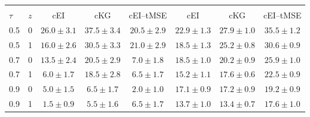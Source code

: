 \begin{tabular}{@{}llcccccc@{}}
\toprule
 & &  &  \\
\cmidrule(lr){3-5}\cmidrule(lr){6-8}
$\tau$ & $z$ & cEI & cKG & cEI--tMSE & cEI & cKG & cEI--tMSE \\
 & 0 & $26.0{\pm}3.1$ & $37.5{\pm}3.4$ & $20.5{\pm}2.9$ & $22.9{\pm}1.3$ & $27.9{\pm}1.0$ & $35.5{\pm}1.2$ \\
0.5 & 1 & $16.0{\pm}2.6$ & $30.5{\pm}3.3$ & $21.0{\pm}2.9$ & $18.5{\pm}1.3$ & $25.2{\pm}0.8$ & $30.6{\pm}0.9$ \\
0.7 & 0 & $13.5{\pm}2.4$ & $20.5{\pm}2.9$ & $7.0{\pm}1.8$ & $18.5{\pm}1.0$ & $20.2{\pm}0.9$ & $25.9{\pm}1.0$ \\
0.7 & 1 & $6.0{\pm}1.7$ & $18.5{\pm}2.8$ & $6.5{\pm}1.7$ & $15.2{\pm}1.1$ & $17.6{\pm}0.6$ & $22.5{\pm}0.9$ \\
0.9 & 0 & $5.0{\pm}1.5$ & $6.5{\pm}1.7$ & $2.0{\pm}1.0$ & $17.1{\pm}0.9$ & $17.2{\pm}0.9$ & $19.2{\pm}0.9$ \\
0.9 & 1 & $1.5{\pm}0.9$ & $5.5{\pm}1.6$ & $6.5{\pm}1.7$ & $13.7{\pm}1.0$ & $13.4{\pm}0.7$ & $17.6{\pm}1.0$ \\
\bottomrule
\end{tabular}
